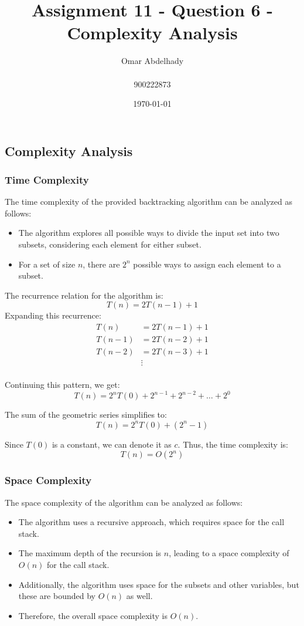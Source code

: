 \documentclass{article}
\title{Assignment 11 - Question 6 - Complexity Analysis}
\author{Omar Abdelhady \\ \\900222873}
\date{\today}
\begin{document}
\maketitle

\newpage

\subsection*{Complexity Analysis}
\subsubsection*{Time Complexity}

The time complexity of the provided backtracking algorithm can be analyzed as follows:

\begin{itemize}
    \item The algorithm explores all possible ways to divide the input set into two subsets, considering each element for either subset.
    \item For a set of size $n$, there are $2^n$ possible ways to assign each element to a subset.
\end{itemize}

The recurrence relation for the algorithm is:
\[
T(n) = 2T(n-1) + 1
\]
Expanding this recurrence:
\begin{align*}
T(n) &= 2T(n-1) + 1 \\
T(n-1) &= 2T(n-2) + 1 \\
T(n-2) &= 2T(n-3) + 1 \\
&\vdots \\
\end{align*}

Continuing this pattern, we get:
\[
T(n) = 2^n T(0) + 2^{n-1} + 2^{n-2} + \ldots + 2^0
\]

The sum of the geometric series simplifies to:
\[
T(n) = 2^n T(0) + (2^n - 1)
\]

Since $T(0)$ is a constant, we can denote it as $c$. Thus, the time complexity is:
\[
T(n) = O(2^n)
\]

\subsubsection*{Space Complexity}
The space complexity of the algorithm can be analyzed as follows:
\begin{itemize}
    \item The algorithm uses a recursive approach, which requires space for the call stack.
    \item The maximum depth of the recursion is $n$, leading to a space complexity of $O(n)$ for the call stack.
    \item Additionally, the algorithm uses space for the subsets and other variables, but these are bounded by $O(n)$ as well.
    \item Therefore, the overall space complexity is $O(n)$.
\end{itemize}
\end{document}
